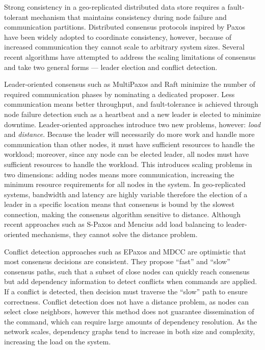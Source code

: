 
Strong consistency in a geo-replicated distributed data store requires a fault-tolerant
mechanism that maintains consistency during node failure and communication partitions.
Distributed consensus protocols inspired by Paxos \cite{lamport_paxos_2001} have been
widely adopted to coordinate consistency, however, because of increased communication
they cannot scale to arbitrary system sizes\cite{2016arXiv160806696H}.
Several recent algorithms have attempted to address the scaling limitations of consensus
and take two general forms --- leader election and conflict detection.

Leader-oriented consensus such as MultiPaxos \cite{lamport_paxos_2001} and Raft
\cite{ongaro_search_2014} minimize the number of required communication phases by
nominating a dedicated proposer.
Less communication means better throughput, and fault-tolerance is achieved through node
failure detection such as a heartbeat and a new leader is elected to minimize downtime.
Leader-oriented approaches introduce two new problems, however: \emph{load} and
\emph{distance}.
Because the leader will necessarily do more work and handle more communication than other
nodes, it must have sufficient resources to handle the workload; moreover, since any node
can be elected leader, all nodes must have sufficient resources to handle the workload.
This introduces scaling problems in two dimensions: adding nodes means more communication,
increasing the minimum resource requirements for all nodes in the system.
In geo-replicated systems, bandwidth and latency are highly variable therefore the
election of a leader in a specific location means that consensus is bound by the slowest
connection, making the consensus algorithm sensitive to distance.
Although recent approaches such as S-Paxos \cite{biely_s-paxos:_2012} and Mencius
\cite{mao_mencius:_2008} add load balancing to leader-oriented mechanisms, they cannot
solve the distance problem.

Conflict detection approaches such as EPaxos \cite{moraru_there_2013} and MDCC
\cite{kraska_mdcc:_2013} are optimistic that most consensus decisions are consistent.
They propose ``fast'' and ``slow'' consensus paths, such that a subset of close nodes can
quickly reach consensus but add dependency information to detect conflicts when commands
are applied.
If a conflict is detected, then decision must traverse the ``slow'' path to ensure
correctness.
Conflict detection does not have a distance problem, as nodes can select close neighbors,
however this method does not guarantee dissemination of the command, which can require
large amounts of dependency resolution.
As the network scales, dependency graphs tend to increase in both size and complexity,
increasing the load on the system.

